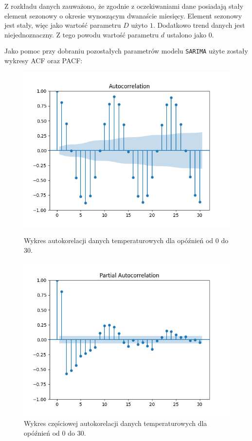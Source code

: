 \documentclass[12pt]{article}
\begin{document}
Z rozkładu danych zauważono, że zgodnie z oczekiwaniami dane posiadają stały element sezonowy o okresie wynoszącym dwanaście miesięcy. Element sezonowy jest stały, więc jako wartość parametru $D$ użyto $1$. Dodatkowo trend danych jest niejednoznaczny. Z tego powodu wartość parametru $d$ ustalono jako $0$.

Jako pomoc przy dobraniu pozostałych parametrów modelu \texttt{SARIMA} użyte zostały wykresy ACF oraz PACF:

\begin{figure}[H]
    \begin{minipage}{.5\textwidth}
        \includegraphics[width=\textwidth]{img/acf.png}
        \caption{Wykres autokorelacji danych temperaturowych dla opóźnień od $0$ do $30$.}
    \end{minipage}
    \begin{minipage}{.5\textwidth}
        \includegraphics[width=\textwidth]{img/pacf.png}
        \caption{Wykres częściowej autokorelacji danych temperaturowych dla opóźnień od $0$ do $30$.}
    \end{minipage}
\end{figure}
\end{document}
